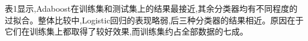 表1显示,Adaboost在训练集和测试集上的结果最接近,其余分类器均有不同程度的过拟合。整体比较中,Logistic回归的表现略弱,后三种分类器的结果相近。原因在于它们在训练集上都取得了较好效果,而训练集约占全部数据的七成。
